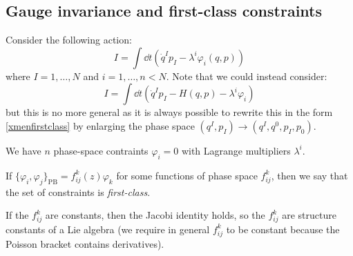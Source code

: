 \documentclass{jknotes}
\begin{document}
\subsection{Gauge invariance and first-class constraints}
Consider the following action:
\begin{equation}
    I = \int\dd{t}\left( \dot{q}^Ip_I - \lambda^i\varphi_i(q,p) \right) 
    \tag{\(\dagger\)}
    \label{xmenfirstclass}
\end{equation}
where \(I=1,\dots,N\) and \(i=1,\dots,n<N\). Note that we could instead consider: 
\begin{equation}
    I = \int\dd{t}\left( \dot{q}^Ip_I-H(q,p)-\lambda^i\varphi_i \right)
    \label{<++>}
\end{equation}
but this is no more general as it is always possible to rewrite this in the form \eqref{xmenfirstclass} by enlarging the phase space \((q^I,p_I)\rightarrow(q^I,q^0,p_I,p_0)\).

We have \(n\) phase-space contraints \(\varphi_i=0\) with Lagrange multipliers \(\lambda^i\).
\begin{defn}
    If \(\{\varphi_i,\varphi_j\}_{\text{PB}} = f_{ij}^k(z)\varphi_k\) for some functions of phase space \(f_{ij}^k\), then we say that the set of constraints is \emph{first-class}.
\end{defn}
If the \(f_{ij}^k\) are constants, then the Jacobi identity holds, so the \(f_{ij}^k\) are structure constants of a Lie algebra (we require in general \(f_{ij}^k\) to be constant because the Poisson bracket contains derivatives).
\end{document}
